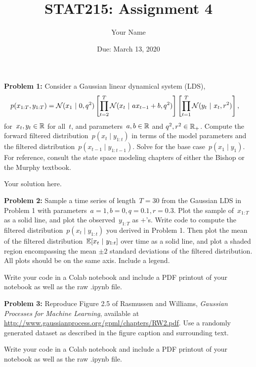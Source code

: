 \documentclass[11pt]{article}
\title{STAT215: Assignment 4}
\author{Your Name}
\date{Due: March 13, 2020}
\begin{document}
\maketitle

\textbf{Problem 1:} Consider a Gaussian linear dynamical system (LDS),
\begin{align*}
    p(x_{1:T}, y_{1:T}) &= \mathcal{N}(x_1 ~\vert~ 0, q^2) \left[ \prod_{t=2}^T \mathcal{N}(x_t ~\vert~ a x_{t-1} + b, q^2) \right] 
    \left[ \prod_{t=1}^T \mathcal{N}(y_{t} ~\vert~ x_t, r^2) \right],
\end{align*}
for~$x_t, y_t \in \mathbb{R}$ for all~$t$, and parameters~$a, b \in \mathbb{R}$ and $q^2, r^2 \in \mathbb{R}_+$.  
Compute the forward filtered distribution~$p(x_t \mid y_{1:t})$ in terms of the model parameters 
and the filtered distribution~$p(x_{t-1} \mid y_{1:t-1})$.  Solve for the base case~$p(x_1 \mid y_1)$.  
For reference, consult the state space modeling chapters of either the Bishop or the Murphy textbook.

\begin{solution}
Your solution here.
\end{solution}

\clearpage 

\textbf{Problem 2:} Sample a time series of length~$T=30$ from the Gaussian LDS in Problem 1 with parameters~$a=1, b=0, q=0.1, r=0.3$.  Plot the sample of~$x_{1:T}$ as a solid line, and plot the observed~$y_{1:T}$ as $\mathsf{+}$'s.  Write code to compute the filtered distribution~$p(x_t \mid y_{1:t})$ you derived in Problem 1.  Then plot the mean of the filtered distribution~$\mathbb{E}[x_t ~\vert~ y_{1:t}]$ over time as a solid line, and plot a shaded region encompassing the mean $\pm 2$ standard deviations of the filtered distribution.  All plots should be on the same axis.  Include a legend.

Write your code in a Colab notebook and include a PDF printout of your notebook as well as the raw .ipynb file.

\clearpage 

\textbf{Problem 3:} Reproduce Figure 2.5 of Rasmussen and Williams, \textit{Gaussian Processes for Machine Learning}, available at \url{http://www.gaussianprocess.org/gpml/chapters/RW2.pdf}.  Use a randomly generated dataset as described in the figure caption and surrounding text. 

Write your code in a Colab notebook and include a PDF printout of your notebook as well as the raw .ipynb file.
\end{document}
